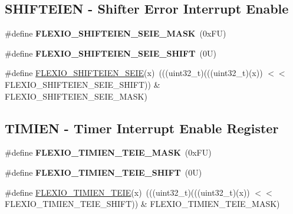 \subsection*{S\+H\+I\+F\+T\+E\+I\+EN -\/ Shifter Error Interrupt Enable}
\begin{DoxyCompactItemize}
\item 
\mbox{\label{group___f_l_e_x_i_o___register___masks_gad5ca3bf397de0d55c09759a3974238a9}} 
\#define {\bfseries F\+L\+E\+X\+I\+O\+\_\+\+S\+H\+I\+F\+T\+E\+I\+E\+N\+\_\+\+S\+E\+I\+E\+\_\+\+M\+A\+SK}~(0x\+F\+U)
\item 
\mbox{\label{group___f_l_e_x_i_o___register___masks_ga582e8f97b155e9f1ddc56e09e4ef935e}} 
\#define {\bfseries F\+L\+E\+X\+I\+O\+\_\+\+S\+H\+I\+F\+T\+E\+I\+E\+N\+\_\+\+S\+E\+I\+E\+\_\+\+S\+H\+I\+FT}~(0\+U)
\item 
\#define \mbox{\hyperlink{group___f_l_e_x_i_o___register___masks_ga02b4e20e4f826f4bd7539edd0abd084c}{F\+L\+E\+X\+I\+O\+\_\+\+S\+H\+I\+F\+T\+E\+I\+E\+N\+\_\+\+S\+E\+IE}}(x)~(((uint32\+\_\+t)(((uint32\+\_\+t)(x)) $<$$<$ F\+L\+E\+X\+I\+O\+\_\+\+S\+H\+I\+F\+T\+E\+I\+E\+N\+\_\+\+S\+E\+I\+E\+\_\+\+S\+H\+I\+FT)) \& F\+L\+E\+X\+I\+O\+\_\+\+S\+H\+I\+F\+T\+E\+I\+E\+N\+\_\+\+S\+E\+I\+E\+\_\+\+M\+A\+SK)
\end{DoxyCompactItemize}
\subsection*{T\+I\+M\+I\+EN -\/ Timer Interrupt Enable Register}
\begin{DoxyCompactItemize}
\item 
\mbox{\label{group___f_l_e_x_i_o___register___masks_ga88e008860a7ee0101e4e12973d5e7464}} 
\#define {\bfseries F\+L\+E\+X\+I\+O\+\_\+\+T\+I\+M\+I\+E\+N\+\_\+\+T\+E\+I\+E\+\_\+\+M\+A\+SK}~(0x\+F\+U)
\item 
\mbox{\label{group___f_l_e_x_i_o___register___masks_ga456d381d5565bebc81f50298d17cc40c}} 
\#define {\bfseries F\+L\+E\+X\+I\+O\+\_\+\+T\+I\+M\+I\+E\+N\+\_\+\+T\+E\+I\+E\+\_\+\+S\+H\+I\+FT}~(0\+U)
\item 
\#define \mbox{\hyperlink{group___f_l_e_x_i_o___register___masks_gafc83a4e75a78a0ecc6db9c3ca8f3308a}{F\+L\+E\+X\+I\+O\+\_\+\+T\+I\+M\+I\+E\+N\+\_\+\+T\+E\+IE}}(x)~(((uint32\+\_\+t)(((uint32\+\_\+t)(x)) $<$$<$ F\+L\+E\+X\+I\+O\+\_\+\+T\+I\+M\+I\+E\+N\+\_\+\+T\+E\+I\+E\+\_\+\+S\+H\+I\+FT)) \& F\+L\+E\+X\+I\+O\+\_\+\+T\+I\+M\+I\+E\+N\+\_\+\+T\+E\+I\+E\+\_\+\+M\+A\+SK)
\end{DoxyCompactItemize}
